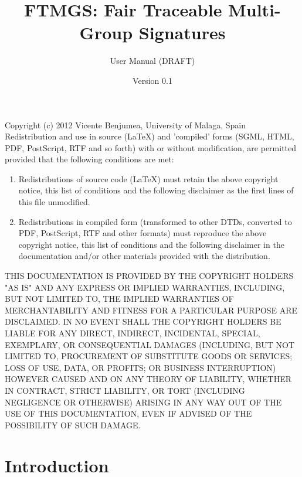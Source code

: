 \documentclass[a4paper]{article}
\title{FTMGS: Fair Traceable Multi-Group Signatures}
\author{User Manual (DRAFT)}
\date{Version 0.1}
\begin{document}
\maketitle
\enlargethispage{8mm}
\tableofcontents
\newpage
\vspace*{\fill}\noindent
\begin{minipage}{\linewidth}\footnotesize
\noindent
Copyright (c)  2012  Vicente Benjumea, University of Malaga, Spain\\

\noindent
Redistribution and use in source (LaTeX) and 'compiled' forms
(SGML, HTML, PDF, PostScript, RTF and so forth) with or without
modification, are permitted provided that the following conditions are
met:
\begin{enumerate}
\item Redistributions of source code (LaTeX) must retain the
      above copyright notice, this list of conditions and the
      following disclaimer as the first lines of this file unmodified.

\item Redistributions in compiled form (transformed to other DTDs,
      converted to PDF, PostScript, RTF and other formats) must
      reproduce the above copyright notice, this list of conditions
      and the following disclaimer in the documentation and/or other
      materials provided with the distribution.
\end{enumerate}
THIS DOCUMENTATION IS PROVIDED BY THE COPYRIGHT HOLDERS "AS IS" AND
ANY EXPRESS OR IMPLIED WARRANTIES, INCLUDING, BUT NOT LIMITED TO, THE
IMPLIED WARRANTIES OF MERCHANTABILITY AND FITNESS FOR A PARTICULAR
PURPOSE ARE DISCLAIMED. IN NO EVENT SHALL THE COPYRIGHT HOLDERS BE
LIABLE FOR ANY DIRECT, INDIRECT, INCIDENTAL, SPECIAL, EXEMPLARY, OR
CONSEQUENTIAL DAMAGES (INCLUDING, BUT NOT LIMITED TO, PROCUREMENT OF
SUBSTITUTE GOODS OR SERVICES; LOSS OF USE, DATA, OR PROFITS; OR
BUSINESS INTERRUPTION) HOWEVER CAUSED AND ON ANY THEORY OF LIABILITY,
WHETHER IN CONTRACT, STRICT LIABILITY, OR TORT (INCLUDING NEGLIGENCE
OR OTHERWISE) ARISING IN ANY WAY OUT OF THE USE OF THIS DOCUMENTATION,
EVEN IF ADVISED OF THE POSSIBILITY OF SUCH DAMAGE.
\end{minipage}
\newpage
\section{Introduction}
\end{document}
